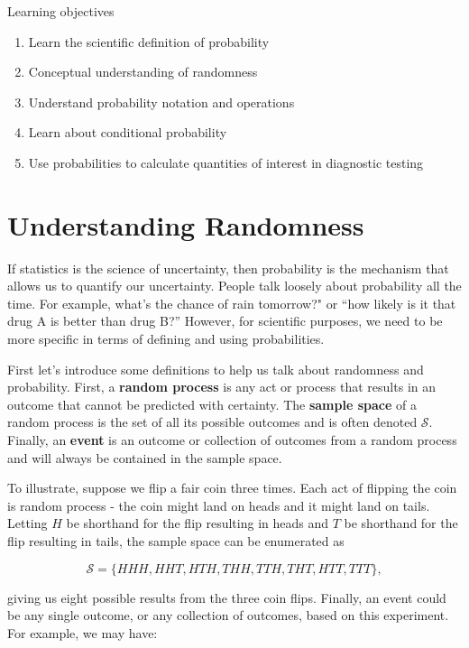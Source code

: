 \documentclass[
]{book}
\providecommand{\tightlist}{%
  \setlength{\itemsep}{0pt}\setlength{\parskip}{0pt}}
\theoremstyle{definition}
\theoremstyle{definition}
\theoremstyle{definition}
\theoremstyle{remark}
\begin{document}
Learning objectives

\begin{enumerate}
\def\labelenumi{\arabic{enumi}.}
\tightlist
\item
  Learn the scientific definition of probability
\item
  Conceptual understanding of randomness
\item
  Understand probability notation and operations
\item
  Learn about conditional probability
\item
  Use probabilities to calculate quantities of interest in diagnostic testing
\end{enumerate}

\hypertarget{ch4_s1}{%
\section{Understanding Randomness}\label{ch4_s1}}

If statistics is the science of uncertainty, then probability is the mechanism that allows us to quantify our uncertainty. People talk loosely about probability all the time. For example, what's the chance of rain tomorrow?" or ``how likely is it that drug A is better than drug B?'' However, for scientific purposes, we need to be more specific in terms of defining and using probabilities.

First let's introduce some definitions to help us talk about randomness and probability. First, a \textbf{random process} is any act or process that results in an outcome that cannot be predicted with certainty. The \textbf{sample space} of a random process is the set of all its possible outcomes and is often denoted \(\mathcal{S}\). Finally, an \textbf{event} is an outcome or collection of outcomes from a random process and will always be contained in the sample space.

To illustrate, suppose we flip a fair coin three times. Each act of flipping the coin is random process - the coin might land on heads and it might land on tails. Letting \(H\) be shorthand for the flip resulting in heads and \(T\) be shorthand for the flip resulting in tails, the sample space can be enumerated as

\[\mathcal{S} = \{HHH, HHT, HTH, THH, TTH, THT, HTT, TTT\},\]

giving us eight possible results from the three coin flips. Finally, an event could be any single outcome, or any collection of outcomes, based on this experiment. For example, we may have:
\end{document}
